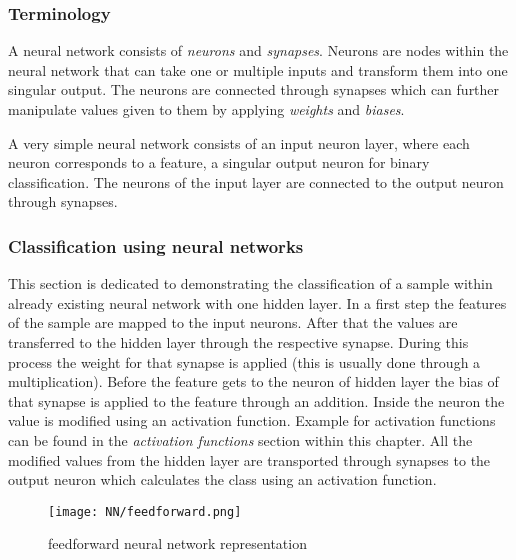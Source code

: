 \subsubsection*{Terminology}
A neural network consists of \textit{neurons} and \textit{synapses}. 
Neurons are nodes within the neural network that can take one or multiple inputs and transform them into one singular output.
The neurons are connected through synapses which can further manipulate values given to them by applying \textit{weights} and \textit{biases}\cite[]{Schmidhuber2015}.

A very simple neural network consists of an input neuron layer, where each neuron corresponds to a feature, a singular output neuron for binary classification. 
The neurons of the input layer are connected to the output neuron through synapses.

\subsubsection*{Classification using neural networks}
This section is dedicated to demonstrating the classification of a sample within already existing neural network with one hidden layer.
In a first step the features of the sample are mapped to the input neurons. After that the values are transferred to the hidden layer through the respective 
synapse. During this process the weight for that synapse is applied (this is usually done through a multiplication). Before the feature gets to the neuron of hidden layer 
the bias of that synapse is applied to the feature through an addition. Inside the neuron the value is modified using an activation function. Example for activation functions can be found 
in the \textit{activation functions} section within this chapter. All the modified values from the hidden layer are transported through synapses to the output neuron 
which calculates the class using an activation function\cite[]{Schmidhuber2015}.
\begin{figure}[H]
    \begin{center}
        \caption[]{feedforward neural network representation}
        \label{fig:nn_rep}
        \texttt{[image: NN/feedforward.png]}
    \end{center}
\end{figure}

